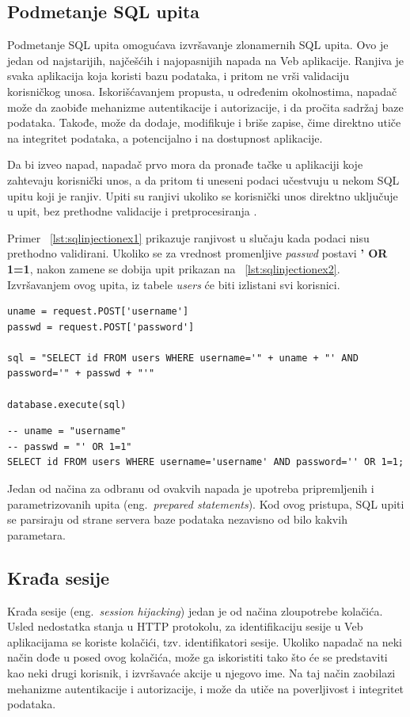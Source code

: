 \documentclass[a4paper]{article}
\begin{document}
\subsection{Podmetanje SQL upita}
\label{subsec:sqlinjection}
Podmetanje SQL upita omogućava izvršavanje zlonamernih SQL upita. Ovo je jedan od najstarijih, najčešćih i najopasnijih napada na Veb aplikacije. Ranjiva je svaka aplikacija koja koristi bazu podataka, i pritom ne vrši validaciju korisničkog unosa. Iskorišćavanjem propusta, u određenim okolnostima, napadač može da zaobiđe mehanizme autentikacije i autorizacije, i da pročita sadržaj baze podataka. Takođe, može da dodaje, modifikuje i briše zapise, čime direktno utiče na integritet podataka, a potencijalno i na dostupnost aplikacije.

Da bi izveo napad, napadač prvo mora da pronađe tačke u aplikaciji koje zahtevaju korisnički unos, a da pritom ti uneseni podaci učestvuju u nekom SQL upitu koji je ranjiv. Upiti su ranjivi ukoliko se korisnički unos direktno uključuje u upit, bez prethodne validacije i pretprocesiranja \cite{sqlinjection1}.

Primer ~\ref{lst:sqlinjectionex1} prikazuje ranjivost u slučaju kada podaci nisu prethodno validirani. Ukoliko se za vrednost promenljive \emph{passwd} postavi \textbf{' OR 1=1}, nakon zamene se dobija upit prikazan na ~\ref{lst:sqlinjectionex2}. Izvršavanjem ovog upita, iz tabele \emph{users} će biti izlistani svi korisnici.
\begin{lstlisting}[title={Primer ranjivog upita},label={lst:sqlinjectionex1}]
uname = request.POST['username']
passwd = request.POST['password']

sql = "SELECT id FROM users WHERE username='" + uname + "' AND password='" + passwd + "'"

database.execute(sql)
\end{lstlisting}
\begin{lstlisting}[title={Upit nakon zamene sa vrednošću promenljivih},label={lst:sqlinjectionex2}]
-- uname = "username"
-- passwd = "' OR 1=1"
SELECT id FROM users WHERE username='username' AND password='' OR 1=1;
\end{lstlisting}

Jedan od načina za odbranu od ovakvih napada je upotreba pripremljenih i parametrizovanih upita (eng.~{\em prepared statements}). Kod ovog pristupa, SQL upiti se parsiraju od strane servera baze podataka nezavisno od bilo kakvih parametara.

\subsection{Krađa sesije}
\label{subsec:sessionhijacking}
Krađa sesije (eng.~{\em session hijacking}) jedan je od načina zloupotrebe kolačića. Usled nedostatka stanja u HTTP protokolu, za identifikaciju sesije u Veb aplikacijama se koriste kolačići, tzv. identifikatori sesije. Ukoliko napadač na neki način dođe u posed ovog kolačića, može ga iskoristiti tako što će se predstaviti kao neki drugi korisnik, i izvršavaće akcije u njegovo ime. Na taj način zaobilazi mehanizme autentikacije i autorizacije, i može da utiče na poverljivost i integritet podataka.
\end{document}
